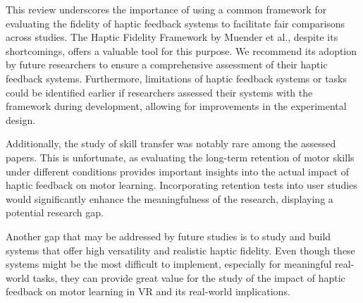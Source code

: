 This review underscores the importance of using a common framework for evaluating the fidelity of haptic feedback systems to facilitate fair comparisons across studies. The Haptic Fidelity Framework by Muender et al., despite its shortcomings, offers a valuable tool for this purpose. We recommend its adoption by future researchers to ensure a comprehensive assessment of their haptic feedback systems. Furthermore, limitations of haptic feedback systems or tasks could be identified earlier if researchers assessed their systems with the framework during development, allowing for improvements in the experimental design.

Additionally, the study of skill transfer was notably rare among the assessed papers. This is unfortunate, as evaluating the long-term retention of motor skills under different conditions provides important insights into the actual impact of haptic feedback on motor learning. Incorporating retention tests into user studies would significantly enhance the meaningfulness of the research, displaying a potential research gap.

Another gap that may be addressed by future studies is to study and build systems that offer high versatility and realistic haptic fidelity. Even though these systems might be the most difficult to implement, especially for meaningful real-world tasks, they can provide great value for the study of the impact of haptic feedback on motor learning in VR and its real-world implications. 
